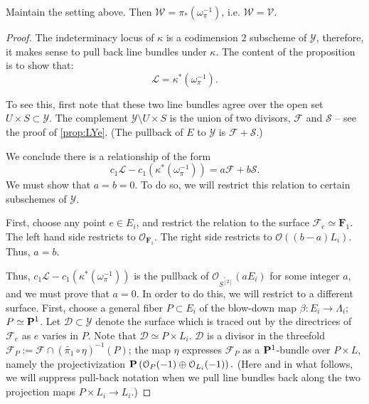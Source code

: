 \documentclass[12pt,reqno]{amsart}
\renewcommand{\to}{{\longrightarrow}}
\numberwithin{equation}{section}
\renewcommand{\O}{\mathcal O}
\newcommand{\F}{\mathbf F}
\newcommand{\td}{\widetilde}
\newcommand{\V}{\mathcal V}
\begin{document}
\begin{proposition}
  \label{prop:whyE} Maintain the setting above.  Then
  $\mathcal{W} = \pi_{*}\left( \omega_{\pi}^{-1} \right)$,
  i.e. $\mathcal{W} = \V$.
\end{proposition}

\begin{proof}
  The indeterminacy locus of $\kappa$ is a codimension $2$ subscheme
  of $\mathcal{Y}$, therefore, it makes sense to pull back line
  bundles under $\kappa$.  The content of the proposition is to show that:
  \[ \mathcal{L} = \kappa^{*}\left( \omega_{\pi}^{-1} \right).\]

  To see this, first note that these two line bundles agree over the
  open set $U \times S \subset \mathcal{Y}$.  The complement
  $\mathcal{Y} \setminus U \times S$ is the union of two divisors,
  $\mathcal{F}$ and $\mathcal{S}$ -- see the proof of
  \autoref{prop:LYe}.  (The pullback of $E$ to $\mathcal{Y}$ is
  $\mathcal{F} + \mathcal{S}$.)

   We conclude there is a relationship of the form
   \[c_{1} \mathcal{L} - c_{1} \left( \kappa^{*}\left(
         \omega_{\pi}^{-1} \right) \right) = a\mathcal{F} +
     b\mathcal{S}.\] We must show that $a = b = 0$.  To do so, we will
   restrict this relation to certain subschemes of $\mathcal{Y}$.

  First, choose any point $e \in E_{i}$, and restrict the relation to
  the surface $\mathcal{F}_{e} \simeq \F_{1}$.  The left hand side
  restricts to $\O_{\F_{1}}$.  The right side restricts to
  $\O\left( (b-a)L_{i} \right)$.  Thus, $a=b$.

  Thus,
  $c_{1} \mathcal{L} - c_{1} \left( \kappa^{*}\left( \omega_{\pi}^{-1}
    \right) \right)$ is the pullback of $\O_{\td{S^{[2]}}}(aE_{i})$
  for some integer $a$, and we must prove that $a = 0$.  In order to
  do this, we will restrict to a different surface.  First, choose a
  general fiber $P \subset E_{i}$ of the blow-down map
  $\beta: E_{i} \to \Lambda_{i}$; $P \simeq \P^{1}$.  Let
  $\mathcal{D} \subset \mathcal{Y}$ denote the surface which is traced
  out by the directrices of $\mathcal{F}_{e}$ as $e$ varies in $P$.
  Note that $\mathcal{D} \simeq P \times L_{i}$.  $\mathcal{D}$ is a
  divisor in the threefold
  $\mathcal{F}_{P} := \mathcal{F} \cap (\td{\pi_{1}} \circ
  \eta)^{-1}(P)$; the map $\eta$ expresses $\mathcal{F}_{P}$ as a
  $\P^{1}$-bundle over $P \times L$, namely the projectivization
  $\P \left( \O_{P}(-1) \oplus \O_{L_{i}}(-1) \right).$ (Here and in
  what follows, we will suppress pull-back notation when we pull line
  bundles back along the two projection maps
  $P \times L_{i} \to L_{i}$.)


\end{proof}
\end{document}
